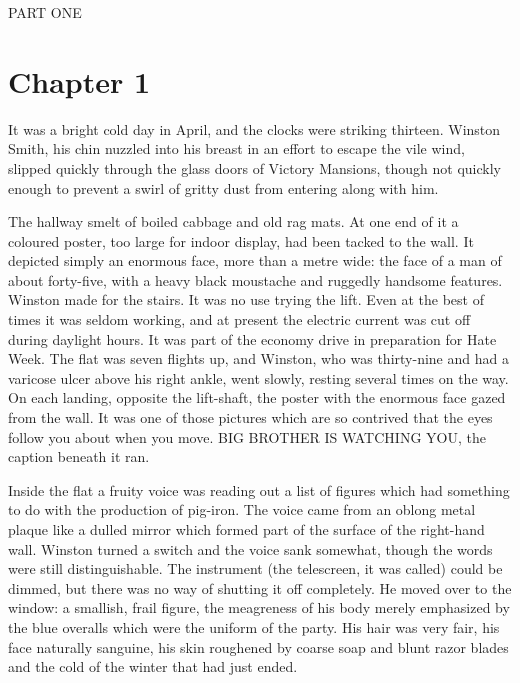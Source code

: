 \documentclass{article}
\begin{document}
PART ONE


\section{Chapter 1}

It was a bright cold day in April, and the clocks were striking thirteen.
Winston Smith, his chin nuzzled into his breast in an effort to escape the
vile wind, slipped quickly through the glass doors of Victory Mansions,
though not quickly enough to prevent a swirl of gritty dust from entering
along with him.

The hallway smelt of boiled cabbage and old rag mats. At one end of it a
coloured poster, too large for indoor display, had been tacked to the wall.
It depicted simply an enormous face, more than a metre wide: the face of a
man of about forty-five, with a heavy black moustache and ruggedly handsome
features. Winston made for the stairs. It was no use trying the lift. Even
at the best of times it was seldom working, and at present the electric
current was cut off during daylight hours. It was part of the economy drive
in preparation for Hate Week. The flat was seven flights up, and Winston,
who was thirty-nine and had a varicose ulcer above his right ankle, went
slowly, resting several times on the way. On each landing, opposite the
lift-shaft, the poster with the enormous face gazed from the wall. It was
one of those pictures which are so contrived that the eyes follow you about
when you move. BIG BROTHER IS WATCHING YOU, the caption beneath it ran.

Inside the flat a fruity voice was reading out a list of figures which had
something to do with the production of pig-iron. The voice came from an
oblong metal plaque like a dulled mirror which formed part of the surface
of the right-hand wall. Winston turned a switch and the voice sank
somewhat, though the words were still distinguishable. The instrument
(the telescreen, it was called) could be dimmed, but there was no way of
shutting it off completely. He moved over to the window: a smallish, frail
figure, the meagreness of his body merely emphasized by the blue overalls
which were the uniform of the party. His hair was very fair, his face
naturally sanguine, his skin roughened by coarse soap and blunt razor
blades and the cold of the winter that had just ended.
\end{document}
